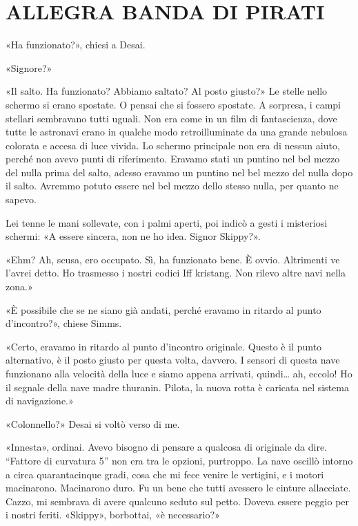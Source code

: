 \chapter{ALLEGRA BANDA DI PIRATI}\label{allegra-banda-di-pirati}

\hfill\break

«Ha funzionato?», chiesi a Desai.

«Signore?»

«Il salto. Ha funzionato? Abbiamo saltato? Al posto giusto?» Le stelle
nello schermo si erano spostate. O pensai che si fossero spostate. A
sorpresa, i campi stellari sembravano tutti uguali. Non era come in un
film di fantascienza, dove tutte le astronavi erano in qualche modo
retroilluminate da una grande nebulosa colorata e accesa di luce vivida.
Lo schermo principale non era di nessun aiuto, perché non avevo punti di
riferimento. Eravamo stati un puntino nel bel mezzo del nulla prima del
salto, adesso eravamo un puntino nel bel mezzo del nulla dopo il salto.
Avremmo potuto essere nel bel mezzo dello stesso nulla, per quanto ne
sapevo.

Lei tenne le mani sollevate, con i palmi aperti, poi indicò a gesti i
misteriosi schermi: «A essere sincera, non ne ho idea. Signor Skippy?».

«Ehm? Ah, scusa, ero occupato. Sì, ha funzionato bene. È ovvio.
Altrimenti ve l'avrei detto. Ho trasmesso i nostri codici Iff kristang.
Non rilevo altre navi nella zona.»

«È possibile che se ne siano già andati, perché eravamo in ritardo al
punto d'incontro?», chiese Simms.

«Certo, eravamo in ritardo al punto d'incontro originale. Questo è il
punto alternativo, è il posto giusto per questa volta, davvero. I
sensori di questa nave funzionano alla velocità della luce e siamo
appena arrivati, quindi\ldots{} ah, eccolo! Ho il segnale della nave
madre thuranin. Pilota, la nuova rotta è caricata nel sistema di
navigazione.»

«Colonnello?» Desai si voltò verso di me.

«Innesta», ordinai. Avevo bisogno di pensare a qualcosa di originale da
dire. ``Fattore di curvatura 5'' non era tra le opzioni, purtroppo. La
nave oscillò intorno a circa quarantacinque gradi, cosa che mi fece
venire le vertigini, e i motori macinarono. Macinarono duro. Fu un bene
che tutti avessero le cinture allacciate. Cazzo, mi sembrava di avere
qualcuno seduto sul petto. Doveva essere peggio per i nostri feriti.
«Skippy», borbottai, «è necessario?»

